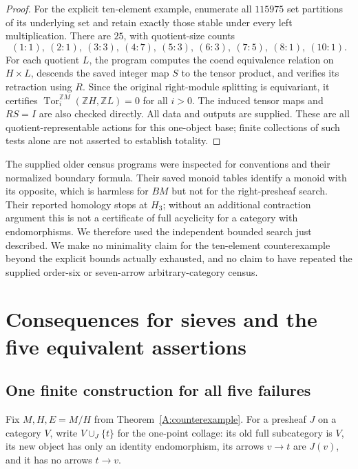 \documentclass[11pt,a4paper]{article}
\theoremstyle{definition}
\theoremstyle{remark}
\newcommand{\Z}{\mathbb Z}
\newcommand{\Tor}{\operatorname{Tor}}
\begin{document}
\begin{proof}
For the explicit ten-element example, enumerate all $115975$ set partitions of its underlying set and retain exactly those stable under every left multiplication. There are $25$, with quotient-size counts
\[
 (1:1),\ (2:1),\ (3:3),\ (4:7),\ (5:3),\ (6:3),\
 (7:5),\ (8:1),\ (10:1).
\]
For each quotient $L$, the program computes the coend equivalence relation on $H\times L$, descends the saved integer map $S$ to the tensor product, and verifies its retraction using $R$. Since the original right-module splitting is equivariant, it certifies $\Tor_i^{\Z M}(\Z H,\Z L)=0$ for all $i>0$. The induced tensor maps and $RS=I$ are also checked directly. All data and outputs are supplied. These are all quotient-representable actions for this one-object base; finite collections of such tests alone are not asserted to establish totality.
\end{proof}

The supplied older census programs were inspected for conventions and their normalized boundary formula. Their saved monoid tables identify a monoid with its opposite, which is harmless for $BM$ but not for the right-presheaf search. Their reported homology stops at $H_3$; without an additional contraction argument this is not a certificate of full acyclicity for a category with endomorphisms. We therefore used the independent bounded search just described. We make no minimality claim for the ten-element counterexample beyond the explicit bounds actually exhausted, and no claim to have repeated the supplied order-six or seven-arrow arbitrary-category census.




\section{Consequences for sieves and the five equivalent assertions}

\subsection{One finite construction for all five failures}

Fix $M,H,E=M/H$ from Theorem~\ref{A:counterexample}. For a presheaf $J$ on a category $V$, write $V\cup_J\{t\}$ for the one-point collage: its old full subcategory is $V$, its new object has only an identity endomorphism, its arrows $v\to t$ are $J(v)$, and it has no arrows $t\to v$.
\end{document}
